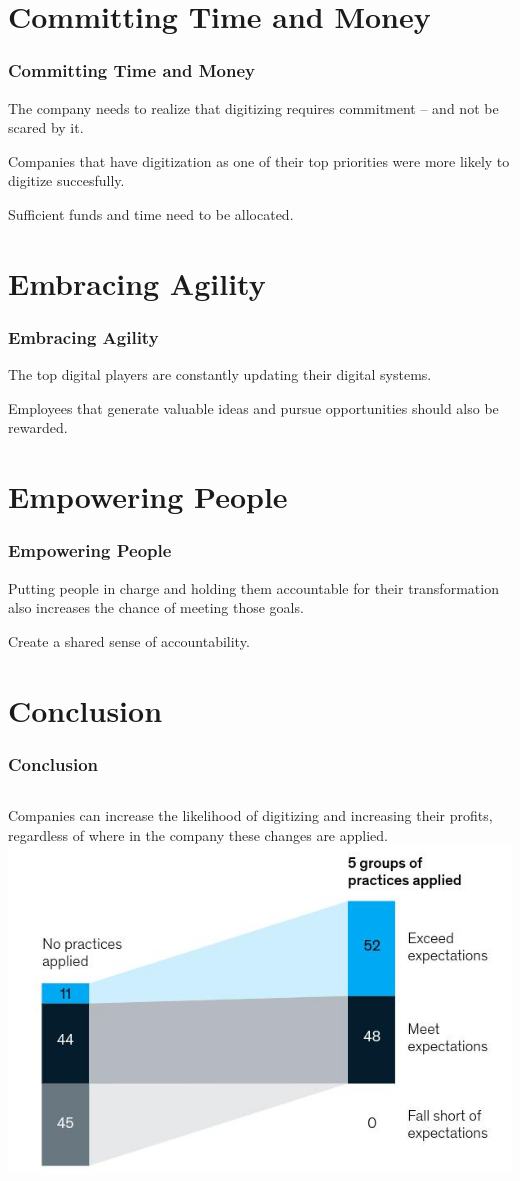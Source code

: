 \documentclass{beamer}
\begin{document}
\section{Committing Time and Money}
\begin{frame}
	\frametitle{Committing Time and Money}
	The company needs to realize that digitizing requires
	commitment -- and not be scared by it.\pause

	Companies that have digitization as one of their top
	priorities were more likely to digitize succesfully.\pause

	Sufficient funds and time need to be allocated.
\end{frame}

\section{Embracing Agility}
\begin{frame}
	\frametitle{Embracing Agility}
	The top digital players are constantly updating their
	digital systems.\pause

	Employees that generate valuable ideas and pursue 
	opportunities should also be rewarded.
\end{frame}

\section{Empowering People}
\begin{frame}
	\frametitle{Empowering People}
	Putting people in charge and holding them accountable 
	for their transformation also increases the chance of 
	meeting those goals.\pause

	Create a shared sense of accountability.
\end{frame}
\section{Conclusion}
\begin{frame}
	\frametitle{Conclusion}
	\begin{columns}
	Companies can increase the likelihood of digitizing and 
	increasing their profits, regardless of where in the 
	company these changes are applied.
		\includegraphics[scale=0.2]{profits}
	\end{columns}
\end{frame}
\end{document}
